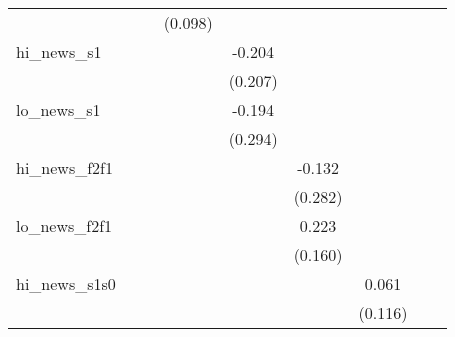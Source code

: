 {\begin{tabular}{l*{8}{c}}
            &                     &                     &     (0.098)         &                     &                     &                     &                     &                     \\
\addlinespace
hi\_news\_s1  &                     &                     &                     &      -0.204         &                     &                     &                     &                     \\
            &                     &                     &                     &     (0.207)         &                     &                     &                     &                     \\
\addlinespace
lo\_news\_s1  &                     &                     &                     &      -0.194         &                     &                     &                     &                     \\
            &                     &                     &                     &     (0.294)         &                     &                     &                     &                     \\
\addlinespace
hi\_news\_f2f1&                     &                     &                     &                     &      -0.132         &                     &                     &                     \\
            &                     &                     &                     &                     &     (0.282)         &                     &                     &                     \\
\addlinespace
lo\_news\_f2f1&                     &                     &                     &                     &       0.223         &                     &                     &                     \\
            &                     &                     &                     &                     &     (0.160)         &                     &                     &                     \\
\addlinespace
hi\_news\_s1s0&                     &                     &                     &                     &                     &       0.061         &                     &                     \\
            &                     &                     &                     &                     &                     &     (0.116)         &                     &                     \\

\end{tabular}}
